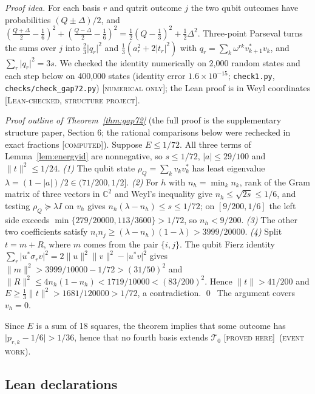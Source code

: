 \documentclass[11pt]{article}
\newcommand{\C}{\mathbb{C}}
\newcommand{\abs}[1]{\lvert #1\rvert}
\newcommand{\norm}[1]{\lVert #1\rVert}
\newcommand{\Tz}{\mathcal{T}_0}          %
\newcommand{\E}{E}                       %
\newcommand{\st}[1]{\textsc{[#1]}}
\newcommand{\stproved}{\st{proved here}}
\newcommand{\stlean}{\st{Lean-checked, structure project}}
\newcommand{\stcomp}{\st{computed}}
\newcommand{\stnum}{\st{numerical only}}
\newcommand{\event}{\textsc{(event work)}}
\theoremstyle{definition}
\theoremstyle{remark}
\begin{document}
\emph{Proof idea.} For each basis $r$ and qutrit outcome $j$ the two qubit outcomes have probabilities
$(Q\pm\Delta)/2$, and $(\tfrac{Q+\Delta}2-\tfrac16)^2+(\tfrac{Q-\Delta}2-\tfrac16)^2=\tfrac12(Q-\tfrac13)^2+\tfrac12\Delta^2$.
Three-point Parseval turns the sums over $j$ into $\tfrac23\abs{q_r}^2$ and $\tfrac13(a_r^2+2\abs{t_r}^2)$ with
$q_r=\sum_k\omega^{rk}v_{k+1}^\ast v_k$, and $\sum_r\abs{q_r}^2=3s$. We checked the identity numerically on
2,000 random states and each step below on 400,000 states (identity error $1.6\times10^{-15}$;
\texttt{check1.py}, \texttt{checks/check\_gap72.py}) \stnum; the Lean proof is in Weyl coordinates \stlean.

\emph{Proof outline of Theorem~\ref{thm:gap72}} (the full proof is the supplementary structure paper, Section 6; the
rational comparisons below were rechecked in exact fractions \stcomp). Suppose $\E\le1/72$. All three terms
of Lemma~\ref{lem:energyid} are nonnegative, so $s\le1/72$, $\abs a\le29/100$ and $\norm t^2\le1/24$.
\emph{(1)} The qubit state $\rho_Q=\sum_kv_kv_k^\ast$ has least eigenvalue $\lambda=(1-\abs a)/2\in(71/200,1/2]$.
\emph{(2)} For $h$ with $n_h=\min_kn_k$, rank of the Gram matrix of three vectors in $\C^2$ and Weyl's inequality give
$n_h\le\sqrt{2s}\le1/6$, and testing $\rho_Q\succeq\lambda I$ on $v_h$ gives $n_h(\lambda-n_h)\le s\le1/72$; on
$[9/200,1/6]$ the left side exceeds $\min\{279/20000,113/3600\}>1/72$, so $n_h<9/200$.
\emph{(3)} The other two coefficients satisfy $n_in_j\ge(\lambda-n_h)(1-\lambda)>3999/20000$.
\emph{(4)} Split $t=m+R$, where $m$ comes from the pair $\{i,j\}$. The qubit Fierz identity
$\sum_r\abs{u^\ast\sigma_rv}^2=2\norm u^2\norm v^2-\abs{u^\ast v}^2$ gives $\norm m^2>3999/10000-1/72>(31/50)^2$ and
$\norm R^2\le4n_h(1-n_h)<1719/10000<(83/200)^2$. Hence $\norm t>41/200$ and
$\E\ge\tfrac13\norm t^2>1681/120000>1/72$, a contradiction. \qed\ The argument covers $v_h=0$.

Since $\E$ is a sum of 18 squares, the theorem implies that some outcome has $\abs{p_{r,k}-1/6}>1/36$, hence that no
fourth basis extends $\Tz$ \stproved\ \event.

\subsection{Lean declarations}
\end{document}
